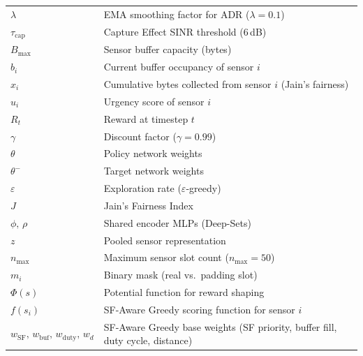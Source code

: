 \begin{longtable}{ll}
    $\lambda$               & EMA smoothing factor for ADR ($\lambda = 0.1$) \\
    $\tau_{\mathrm{cap}}$   & Capture Effect SINR threshold (6\,dB) \\
    $B_{\max}$              & Sensor buffer capacity (bytes) \\
    $b_i$                   & Current buffer occupancy of sensor $i$ \\
    $x_i$                   & Cumulative bytes collected from sensor $i$ (Jain's fairness) \\
    $u_i$                   & Urgency score of sensor $i$ \\
    $R_t$                   & Reward at timestep $t$ \\
    $\gamma$                & Discount factor ($\gamma = 0.99$) \\
    $\theta$                & Policy network weights \\
    $\theta^-$              & Target network weights \\
    $\varepsilon$           & Exploration rate ($\varepsilon$-greedy) \\
    $J$                     & Jain's Fairness Index \\
    $\phi,\,\rho$           & Shared encoder MLPs (Deep-Sets) \\
    $z$                     & Pooled sensor representation \\
    $n_{\max}$              & Maximum sensor slot count ($n_{\max} = 50$) \\
    $m_i$                   & Binary mask (real vs.\ padding slot) \\
    $\Phi(s)$               & Potential function for reward shaping \\
    $f(s_i)$                & SF-Aware Greedy scoring function for sensor $i$ \\
    $w_{\mathrm{SF}},\,w_{\mathrm{buf}},\,w_{\mathrm{duty}},\,w_d$ & SF-Aware Greedy base weights (SF priority, buffer fill, duty cycle, distance) \\
\end{longtable}

\clearpage
